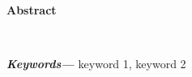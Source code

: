 \vspace*{4cm}
\begin{center}
    {\Large\bf Abstract}
\end{center} 
\lipsum[1] \\

\providecommand{\keywords}[1] {
  \small	
  \textbf{\textit{Keywords---}} #1
}
\keywords{keyword 1, keyword 2}

